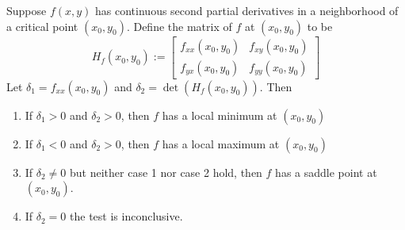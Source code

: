 \documentclass[12pt, a4paper, oneside, openright, titlepage]{book}
\begin{document}
\begin{appendices}
    \begin{namthm}
        Suppose $f(x,y)$ has continuous second partial derivatives in a neighborhood of a critical point $(x_0,y_0)$. Define the  matrix of $f$ at $(x_0,y_0)$ to be \begin{equation}
            H_f(x_0,y_0) := \begin{bmatrix} f_{xx}(x_0,y_0) & f_{xy}(x_0,y_0) \\ f_{yx}(x_0,y_0) & f_{yy}(x_0,y_0) \end{bmatrix}
        \end{equation}
        Let $\delta_1 = f_{xx}(x_0,y_0)$ and $\delta_2 = \det(H_f(x_0,y_0))$. Then \begin{enumerate}
            \item If $\delta_1 > 0$ and $\delta_2 > 0$, then $f$ has a local minimum at $(x_0,y_0)$
            \item If $\delta_1 < 0$ and $\delta_2 > 0$, then $f$ has a local maximum at $(x_0,y_0)$
            \item If $\delta_2 \neq 0$ but neither case 1 nor case 2 hold, then $f$ has a saddle point at $(x_0,y_0)$.
            \item If $\delta_2 = 0$ the test is inconclusive.
        \end{enumerate}
    \end{namthm}
    

\end{appendices}
\end{document}
